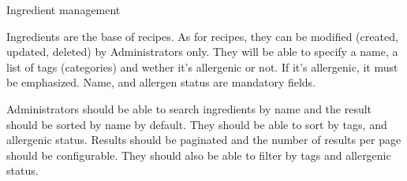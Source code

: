 \usecasedesc
{Ingredient management \label{sec:ingredientManagement}}
{
  Ingredients are the base of recipes. As for recipes, they can be modified (created, updated, deleted) by Administrators only. They will be able to specify a name, a list of tags (categories) and wether it's allergenic or not. If it's allergenic, it must be emphasized. Name, and allergen status are mandatory fields.

  Administrators should be able to search ingredients by name and the result should be sorted by name by default. They should be able to sort by tags, and allergenic status. Results should be paginated and the number of results per page should be configurable. They should also be able to filter by tags and allergenic status.

}
